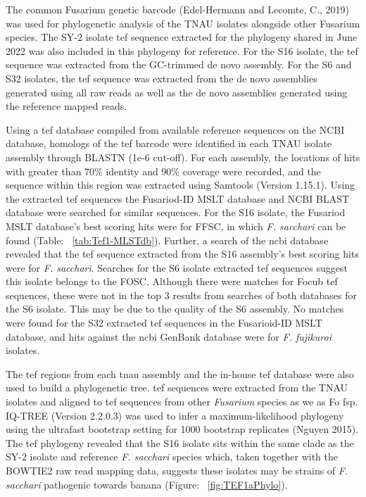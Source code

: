 The common Fusarium genetic barcode (Edel-Hermann and Lecomte, C., 2019) was used for phylogenetic analysis of the TNAU isolates alongside other Fusarium species. The SY-2 isolate \ac{tef} sequence extracted for the phylogeny shared in June 2022 was also included in this phylogeny for reference. For the S16 isolate, the \ac{tef} sequence was extracted from the GC-trimmed de novo assembly. For the S6 and S32 isolates, the \ac{tef} sequence was extracted from the de novo assemblies generated using all raw reads as well as the de novo assemblies generated using the reference mapped reads. 

Using a \ac{tef} database compiled from available reference sequences on the NCBI database, homologs of the \ac{tef} barcode were identified in each TNAU isolate assembly through BLASTN (1e-6 cut-off). For each assembly, the locations of hits with greater than 70\% identity and 90\% coverage were recorded, and the sequence within this region was extracted using Samtools (Version 1.15.1). Using the extracted \ac{tef} sequences the Fusariod-ID MSLT database and NCBI BLAST database were searched for similar sequences. For the S16 isolate, the Fusariod MSLT database's best scoring hits were for \ac{FFSC}, in which \textit{F. sacchari} can be found (Table: ~\ref{tab:Tef1-MLSTdb}). Further, a search of the \ac{ncbi} database revealed that the \ac{tef} sequence extracted from the S16 assembly's best scoring hits were for \textit{F. sacchari}. Searches for the S6 isolate extracted \ac{tef} sequences suggest this isolate belongs to the \ac{FOSC}. Although there were matches for \ac{Focub} \ac{tef} sequences, these were not in the top 3 results from searches of both databases for the S6 isolate. This may be due to the quality of the S6 assembly. No matches were found for the S32 extracted \ac{tef} sequences in the Fusarioid-ID MSLT database, and hits against the \ac{ncbi} GenBank database were for \textit{F. fujikuroi} isolates. 



The \ac{tef} regions from each \ac{tnau} assembly and the in-house \ac{tef} database were also used to build a phylogenetic tree. \Ac{tef} sequences were extracted from the \ac{TNAU} isolates and aligned to \ac{tef} sequences from other \textit{Fusarium} species as we as \ac{Fo} \ac{fsp}. IQ-TREE (Version 2.2.0.3) was used to infer a maximum-likelihood phylogeny using the ultrafast bootstrap setting for 1000 bootstrap replicates (Nguyen 2015). The \ac{tef} phylogeny revealed that the  S16 isolate sits within the same clade as the SY-2 isolate and reference \textit{F. sacchari} species which, taken together with the BOWTIE2 raw read mapping data, suggests these isolates may be strains of \textit{F. sacchari} pathogenic towards banana (Figure: ~\ref{fig:TEF1aPhylo}). 

